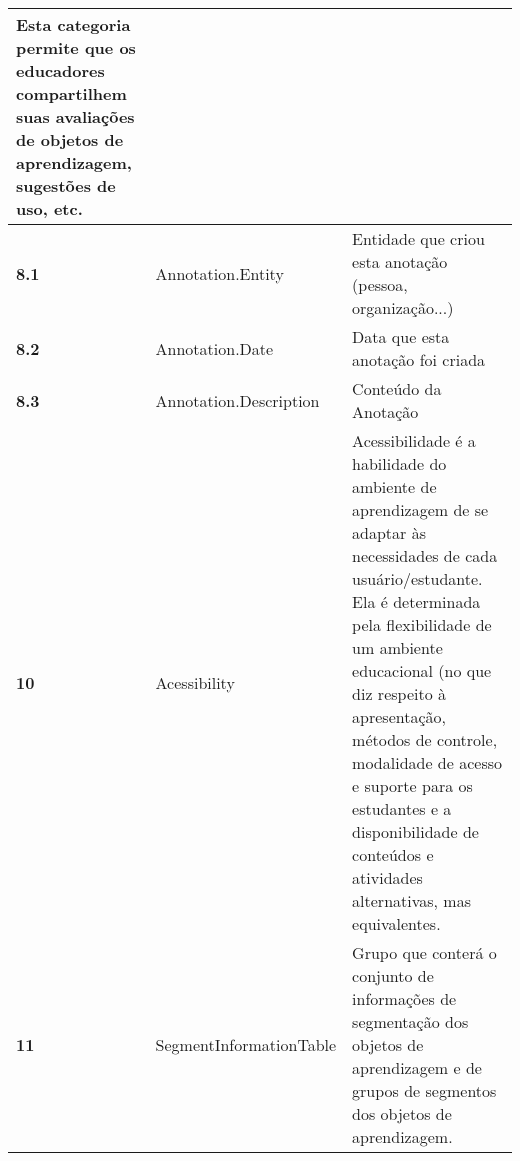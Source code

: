 \begin{xltabular}{\textwidth}{|l|l|X|}
Esta categoria permite que os educadores compartilhem suas avaliações de objetos de aprendizagem, sugestões de uso, etc.\\ \hline
\textbf{8.1} & Annotation.Entity & Entidade que criou esta anotação (pessoa, organização...) \\ \hline
\textbf{8.2} & Annotation.Date & Data que esta anotação foi criada \\ \hline
\textbf{8.3} & Annotation.Description & Conteúdo da Anotação \\ \hline
\textbf{10} & Acessibility & Acessibilidade é a habilidade do ambiente de aprendizagem de se adaptar às necessidades de cada usuário/estudante. Ela é determinada pela flexibilidade de um ambiente educacional (no que diz respeito à apresentação, métodos de controle, modalidade de acesso e suporte para os estudantes e a disponibilidade de conteúdos e atividades alternativas, mas equivalentes.\\ \hline
\textbf{11} & SegmentInformationTable & Grupo que conterá o conjunto de informações de segmentação dos objetos de aprendizagem e de grupos de segmentos dos objetos de aprendizagem.\\ \hline
\end{xltabular}